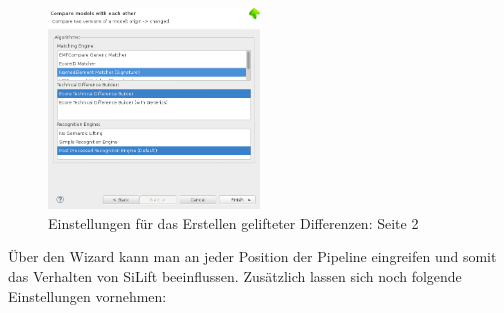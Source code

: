 \begin{figure}[h!]
\centering
\includegraphics[width=0.5\textwidth]{lifting/graphics/silift-wizard_compare_page2.png}
\caption{Einstellungen für das Erstellen gelifteter Differenzen: Seite 2}
\label{silift-wizard_compare_page2}
\end{figure}



Über den Wizard kann man an jeder Position der Pipeline eingreifen und somit das Verhalten von SiLift beeinflussen. Zusätzlich lassen sich noch folgende Einstellungen vornehmen:

